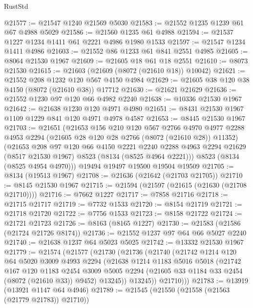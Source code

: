 \begin{lexlean}{RustStd}
\begin{coremodule}
{\begin{coremodule}
{{{{{{{{{{{{{{{{{{{{{{{{{{{{{{{{{{{{{{{{{{{{{{{{{{{{{@21577 := @21547 @1240 @21569 @5030
@21583 := @21552 @1235 @1239 @61 @67 @4988 @5029
@21586 := @21560 @1235 @61 @4988
@21594 := @21537 @1227 @1234 @1411 @61 @2221 @4986 @1980 @1533
@21597 := @21547 @1234 @1411 @4986
@21603 := @21552 @86 @1233 @61 @841 @2551 @4985
@21605 := @8064 @21530 @1967
@21609 := @21605 @18 @61 @18 @2551
@21610 := @8073 @21530
@21615 := @21603 (@21609 (@8072 (@21610 @18)) @10042)
@21621 := @21552 @208 @1232 @120 @567 @4150 @4984
@21629 := @21605 @38 @120 @38 @4150 (@8072 (@21610 @38)) @17712
@21630 := @21621 @21629
@21636 := @21552 @1230 @97 @120 @66 @4982 @2240
@21638 := @10336 @21530 @1967
@21642 := @21638 @1230 @120 @4971 @4980
@21651 := @8431 @21530 @1967 @1109 @1229 @841 @120 @4971 @4978 @4587
@21653 := @8445 @21530 @1967
@21703 := @21651
    (@21653
      @156
      @210
      @120
      @567
      @2766
      @4970
      @4977
      @2288
      @4953
      @2294
      (@21605 @28 @120 @28 @2766 (@8072 (@21610 @28)) @11352)
      (@21653
        @208
        @97
        @120
        @66
        @4150
        @2221
        @2240
        @2288
        @4963
        @2294
        @21629
        (@8517 @21530 @1967)
        @8523
        (@8134 (@8525 @4964 @2221)))
      @8523
      (@8134 (@8525 @4954 @4970)))
    @19494
    @19497
    @19500
    @19504
    @19509
@21705 := @8134 (@19513 @1967)
@21708 := @21636 (@21642 (@21703 @21705))
@21710 := @8145 @21530 @1967
@21715 := @21594 (@21597 (@21615 (@21630 (@21708 @21710))))
@21716 := @7662 @1227
@21717 := @7858 @21716
@21718 := @21715 @21717
@21719 := @7732 @1533
@21720 := @8154 @21719
@21721 := @21718 @21720
@21722 := @7756 @1533
@21723 := @8158 @21722
@21724 := @21721 @21723
@21726 := @8163 (@8165 @1227)
@21730 := @21583 (@21586 (@21724 @21726 @8174))
@21736 := @21552 @1237 @97 @64 @66 @5027 @2240
@21740 := @21638 @1237 @64 @5023 @5025
@21742 := @13332 @21530 @1967
@21779 := @21574
    (@21577
      (@21730
        (@21736
          (@21740
            (@21742
              @1214
              @120
              @64
              @5020
              @3009
              @4993
              @2294
              (@21638
                @1214
                @1183
                @5016
                @5018
                (@21742
                  @167
                  @120
                  @1183
                  @2454
                  @3009
                  @5005
                  @2294
                  (@21605 @33 @1184 @33 @2454 (@8072 (@21610 @33)) @9452)
                  @13245))
              @13245))
          @21710)))
@21783 := @13919 (@13921 @1147 @64 @4946)
@21789 := @21545 (@21550 (@21558 (@21563 (@21779 @21783)) @21710))
}}}}}}}}}}}}}}}}}}}}}}}}}}}}}}}}}}}}}}}}}}}}}}}}}}}}}
\end{coremodule}}
\end{coremodule}
\end{lexlean}
